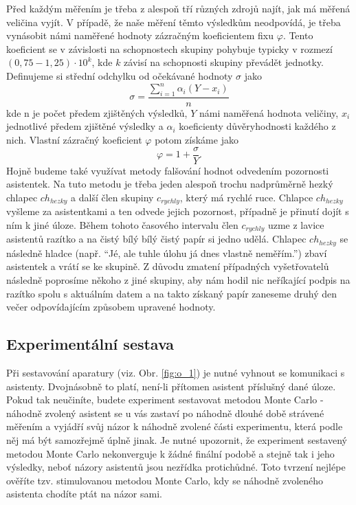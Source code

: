 \documentclass[english]{article}
\begin{document}
Před každým měřením je třeba z alespoň tří různých zdrojů najít, jak má měřená veličina vyjít. V případě, že naše měření těmto výsledkům neodpovídá, je třeba vynásobit námi naměřené hodnoty zázračným koeficientem fixu $\varphi$. Tento koeficient se v závislosti na schopnostech skupiny pohybuje typicky v rozmezí $(0,75 - 1,25) \cdot 10^k$, kde $k$ závisí na schopnosti skupiny převádět jednotky. Definujeme si střední odchylku od očekávané hodnoty $\sigma$ jako 
\begin{equation}\label{eq:up1}
\sigma = \frac{  \sum\limits_{i=1}^{n}\alpha_i ( Y - x_i )  }{ n }
\end{equation}
kde n je počet předem zjištěných výsledků, $Y$ námi naměřená hodnota veličiny, $x_i$ jednotlivé předem zjištěné výsledky a $\alpha_i$ koeficienty důvěryhodnosti každého z nich. Vlastní zázračný koeficient $\varphi$ potom získáme jako
\begin{equation}\label{eq:up2}
\varphi = 1 + \frac{\sigma}{Y}.
\end{equation}
Hojně budeme také využívat metody falšování hodnot odvedením pozornosti asistentek. Na tuto metodu je třeba jeden alespoň trochu nadprůměrně hezký chlapec $ch_{hezky}$ a další člen skupiny $c_{rychly}$, který má rychlé ruce. Chlapce $ch_{hezky}$ vyšleme za asistentkami a ten odvede jejich pozornost, případně je přinutí dojít s ním k jiné úloze. Během tohoto časového intervalu člen $c_{rychly}$ uzme z lavice asistentů razítko a na čistý bílý bílý čistý papír si jedno udělá. Chlapec $ch_{hezky}$ se následně hladce (např. “Jé, ale tuhle úlohu já dnes vlastně neměřím.”) zbaví asistentek a vrátí se ke skupině. Z důvodu zmatení případných vyšetřovatelů následně poprosíme někoho z jiné skupiny, aby nám hodil nic neříkající podpis na razítko spolu s aktuálním datem a na takto získaný papír zaneseme druhý den večer odpovídajícím způsobem upravené hodnoty.

\subsection{Experimentální sestava}
Při sestavování aparatury (viz. Obr. \ref{fig:o_1}) je nutné vyhnout se komunikaci s asistenty. Dvojnásobně to platí, není-li přítomen asistent příslušný dané úloze. Pokud tak neučiníte, budete experiment sestavovat metodou Monte Carlo - náhodně zvolený asistent se u vás zastaví po náhodně dlouhé době strávené měřením a vyjádří svůj názor k náhodně zvolené části experimentu, která podle něj má být samozřejmě úplně jinak. Je nutné upozornit, že experiment sestavený metodou Monte Carlo nekonverguje k žádné finální podobě a stejně tak i jeho výsledky, neboť názory asistentů jsou nezřídka protichůdné. Toto tvrzení nejlépe ověříte tzv. stimulovanou metodou Monte Carlo, kdy se náhodně zvoleného asistenta chodíte ptát na názor sami.
\end{document}
